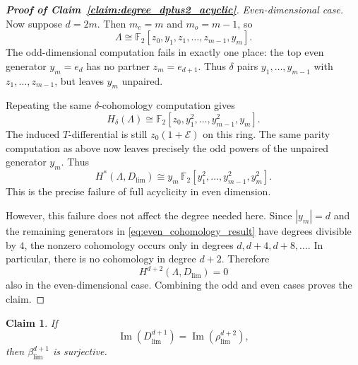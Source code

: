 \documentclass[aps,prx,reprint,superscriptaddress,twocolumn,amsmath,amssymb,amsfonts, nofootinbib]{revtex4-2}
\theoremstyle{apsstyle}
\newtheorem{claim}{Claim}
\begin{document}
\begin{proof}[\textnormal{\textbf{Proof of Claim~\ref{claim:degree_dplus2_acyclic}}}]
\medskip

\noindent \textit{Even-dimensional case.}
Now suppose $d=2m$. Then $m_e=m$ and $m_o=m-1$, so
\begin{equation}
\Lambda\cong \mathbb F_2[z_0,y_1,z_1,\dots,z_{m-1},y_m].
\end{equation}
The odd-dimensional computation fails in exactly one place: the top even generator $y_m=e_d$ has no partner $z_m=e_{d+1}$. Thus $\delta$ pairs $y_1,\dots,y_{m-1}$ with $z_1,\dots,z_{m-1}$, but leaves $y_m$ unpaired.

\noindent Repeating the same $\delta$-cohomology computation gives
\begin{equation}
H_\delta(\Lambda)
\cong
\mathbb F_2[z_0,y_1^2,\dots,y_{m-1}^2,y_m].
\label{eq:Hdelta_result_even}
\end{equation}
The induced $T$-differential is still $z_0(1+\mathcal E)$ on this ring. The same parity computation as above now leaves precisely the odd powers of the unpaired generator $y_m$. Thus
\begin{equation}
H^*(\Lambda,D_{\lim})
\cong
y_m\,\mathbb F_2[y_1^2,\dots,y_{m-1}^2,y_m^2].
\label{eq:even_cohomology_result}
\end{equation}
This is the precise failure of full acyclicity in even dimension.

\bigskip 

\noindent However, this failure does not affect the degree needed here. Since $|y_m|=d$ and the remaining generators in \eqref{eq:even_cohomology_result} have degrees divisible by $4$, the nonzero cohomology occurs only in degrees $d,d+4,d+8,\dots$. In particular, there is no cohomology in degree $d+2$. Therefore
\begin{equation}
H^{d+2}(\Lambda,D_{\lim})=0
\end{equation}
also in the even-dimensional case. Combining the odd and even cases proves the claim.
\end{proof}



\medskip

\begin{claim}
\label{claim:imD_equal_imrho}
If
\begin{equation}
\operatorname{Im}(D_{\lim}^{d+1})
= \operatorname{Im}(\rho_{\lim}^{d+2}),
\end{equation}
then $\beta_{\lim}^{d+1}$ is surjective.
\end{claim}
\end{document}
